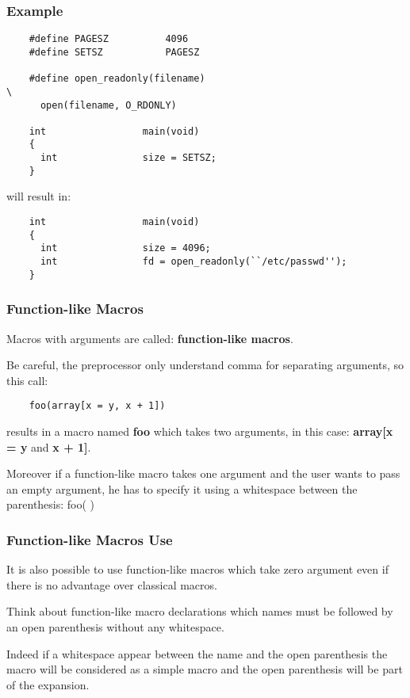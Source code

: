 \documentclass[8pt]{beamer}
\newcommand{\nl}[0]{\vspace{0.4cm}}
\begin{document}
\begin{frame}[containsverbatim]
  \frametitle{Example}

  \begin{verbatim}
    #define PAGESZ          4096
    #define SETSZ           PAGESZ

    #define open_readonly(filename)                                     \
      open(filename, O_RDONLY)

    int                 main(void)
    {
      int               size = SETSZ;
    }
  \end{verbatim}

  will result in:

  \begin{verbatim}
    int                 main(void)
    {
      int               size = 4096;
      int               fd = open_readonly(``/etc/passwd'');
    }
  \end{verbatim}
\end{frame}


\begin{frame}[containsverbatim]
  \frametitle{Function-like Macros}

  Macros with arguments are called: \textbf{function-like macros}.

  \nl

  Be careful, the preprocessor only understand comma for separating arguments,
  so this call:

  \begin{verbatim}
    foo(array[x = y, x + 1])
  \end{verbatim}

  results in a macro named \textbf{foo} which takes two arguments,
  in this case: \textbf{array[x = y} and \textbf{x + 1]}.

  \nl

  Moreover if a function-like macro takes one argument and the user
  wants to pass an empty argument, he has to specify it using a
  whitespace between the parenthesis: foo( )
\end{frame}


\begin{frame}
  \frametitle{Function-like Macros Use}

  It is also possible to use function-like macros which take zero argument
  even if there is no advantage over classical macros.

  \nl

  Think about function-like macro declarations which names \alert{must} be
  followed by an open parenthesis without any whitespace.

  \nl

  Indeed if a whitespace appear between the name and the open parenthesis
  the macro will be considered as a simple macro and the open parenthesis
  will be part of the expansion.
\end{frame}
\end{document}
